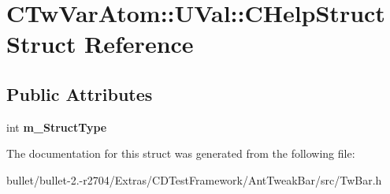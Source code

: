 \hypertarget{struct_c_tw_var_atom_1_1_u_val_1_1_c_help_struct}{\section{C\+Tw\+Var\+Atom\+:\+:U\+Val\+:\+:C\+Help\+Struct Struct Reference}
\label{struct_c_tw_var_atom_1_1_u_val_1_1_c_help_struct}
}
\subsection*{Public Attributes}
\begin{DoxyCompactItemize}
\item 
\hypertarget{struct_c_tw_var_atom_1_1_u_val_1_1_c_help_struct_ad939788a5503e92324f591e21e6e5571}{int {\bfseries m\+\_\+\+Struct\+Type}}\label{struct_c_tw_var_atom_1_1_u_val_1_1_c_help_struct_ad939788a5503e92324f591e21e6e5571}

\end{DoxyCompactItemize}


The documentation for this struct was generated from the following file\+:\begin{DoxyCompactItemize}
\item 
bullet/bullet-\/2.-\/r2704/\+Extras/\+C\+D\+Test\+Framework/\+Ant\+Tweak\+Bar/src/Tw\+Bar.\+h\end{DoxyCompactItemize}

